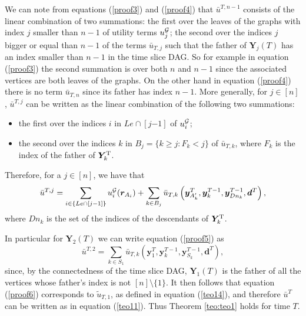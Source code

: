 We can note from equations (\ref{proof3}) and (\ref{proof4}) that $\bar{u}^{T,n-1}$ consists of the linear combination of two summations: the first over the leaves of the graphs with index $j$ smaller than $n-1$ of utility terms $u^{\mathcal{G}}_j$; the second over the indices $j$ bigger or equal than $n-1$ of the terms $\bar{u}_{T,j}$ such that the father of $\bm{Y}_j(T)$ has an index smaller than $n-1$ in the time slice DAG. So for example in equation (\ref{proof3}) the second summation is over both $n$ and $n-1$ since the associated vertices are both leaves of the graphs. On the other hand in equation (\ref{proof4}) there is no term $\bar{u}_{T,n}$ since its father has index $n-1$. More generally, for $j\in [n]$, $\bar{u}^{T,j}$ can be written as the linear combination of the following two summations:
\begin{itemize}
\item the first over the indices $i$ in $Le\cap [j{-1}]$ of $u^{\mathcal{G}}_i$;
\item the second over the indices $k$ in $B_j=\{k\geq j: F_k<j\}$ of $\bar{u}_{T,k}$, where $F_k$ is the index of the father of $\bm{Y}_k^{\textnormal{T}}$.
\end{itemize}
Therefore, for a $j\in[n]$, we have that 
\begin{equation}
\label{proof5}
\bar{u}^{T,j}=\sum_{i\in \{Le\cap [j-1]\}}u^{\Gr}_i(\bm{r}_{A_i})+\sum_{k\in B_j}\bar{u}_{T,k}\left(\bm{y}^T_{A'_k},\bm{y}^{T-1}_k,\bm{y}^{T-1}_{Dn_k},\bm{d}^T\right),
\end{equation}
where $Dn_k$ is the set of the indices of the descendants of $\bm{Y}^{\textnormal{T}}_k$.
 
In particular for $\bm{Y}_2(T)$ we can write equation (\ref{proof5}) as
\begin{equation}
\label{proof6}
\bar{u}^{T,2}=\sum_{k\in S_1}\bar{u}_{T,k}\left(\bm{y}^T_{1},\bm{y}^{T-1}_k,\bm{y}^{T-1}_{S_k},\bm{d}^T\right),
\end{equation}
since, by the connectedness of the time slice DAG, $\bm{Y}_1(T)$ is the father of all the vertices whose father's index is not $[n]\setminus \{1\}$. It then follows that equation (\ref{proof6}) corresponds to $\tilde{u}_{T,1}$, as defined in equation (\ref{teo14}), and therefore $\bar{u}^T$ can be written as in equation (\ref{teo11}). Thus Theorem \ref{teo:teo1} holds for time $T$.

